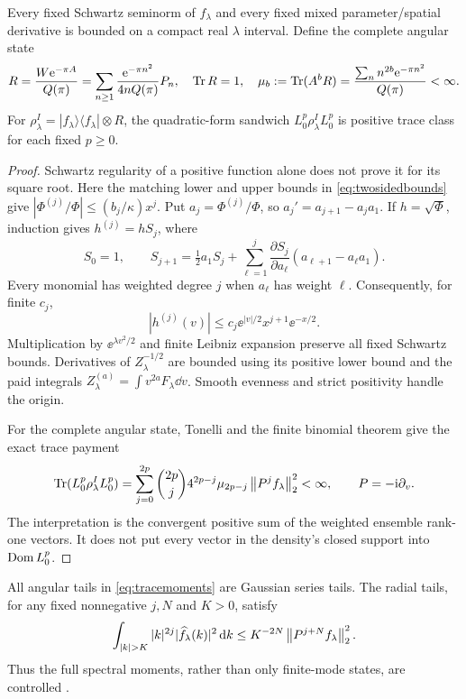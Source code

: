\begin{lemma}
\label{lem:state}
Every fixed Schwartz seminorm of $f_\lambda$ and every fixed mixed
parameter/spatial derivative is bounded on a compact real $\lambda$
interval. Define the complete angular state
\begin{equation}\label{eq:R}
 R=\frac{W\mathrm e^{-\pi A}}{Q(\pi)}
  =\sum_{n\ge1}\frac{\mathrm e^{-\pi n^2}}{4nQ(\pi)}P_n,
 \quad \operatorname{Tr} R=1,
 \quad \mu_b:=\operatorname{Tr}(A^bR)=\frac{\sum_n n^{2b}\mathrm e^{-\pi n^2}}{Q(\pi)}<\infty.
\end{equation}
For $\rho^I_\lambda=|f_\lambda\rangle\langle f_\lambda|\otimes R$,
the quadratic-form sandwich $L_0^p\rho^I_\lambda L_0^p$ is positive
trace class for each fixed $p\ge0$.
\end{lemma}
\begin{proof}
Schwartz regularity of a positive function alone does not prove it for
its square root. Here the matching lower and upper bounds in
\eqref{eq:twosidedbounds} give
$|\Phi^{(j)}/\Phi|\le(b_j/\kappa)x^j$.
Put $a_j=\Phi^{(j)}/\Phi$, so
$a_j'=a_{j+1}-a_ja_1$. If $h=\sqrt\Phi$, induction gives
$h^{(j)}=hS_j$, where
\begin{equation}\label{eq:sqrtRec}
 S_0=1,\qquad
 S_{j+1}=\tfrac12a_1S_j+
 \sum_{\ell=1}^j\frac{\partial S_j}{\partial a_\ell}
 (a_{\ell+1}-a_\ell a_1).
\end{equation}
Every monomial has weighted degree $j$ when $a_\ell$ has weight $\ell$.
Consequently, for finite $c_j$,
\[
 |h^{(j)}(v)|\le c_j\ee^{|v|/2}x^{j+1}\ee^{-x/2}.
\]
Multiplication by $\ee^{\lambda v^2/2}$ and finite Leibniz expansion
preserve all fixed Schwartz bounds. Derivatives of $Z_\lambda^{-1/2}$
are bounded using its positive lower bound and the paid integrals
$Z_\lambda^{(a)}=\int v^{2a}F_\lambda\dd v$. Smooth evenness and strict
positivity handle the origin.

For the complete angular state, Tonelli and the finite binomial theorem
give the exact trace payment
\begin{equation}\label{eq:tracemoments}
 \operatorname{Tr}(L_0^p\rho^I_\lambda L_0^p)
 =\sum_{j=0}^{2p}\binom{2p}{j}4^{2p-j}\mu_{2p-j}
 \left\lVert P^jf_\lambda\right\rVert_2^2<\infty,\qquad P=-\mathrm i\partial_v.
\end{equation}
The interpretation is the convergent positive sum of the weighted
ensemble rank-one vectors. It does not put every vector in the density's
closed support into $\operatorname{Dom} L_0^p$.
\end{proof}

All angular tails in \eqref{eq:tracemoments} are Gaussian series tails.
The radial tails, for any fixed nonnegative $j,N$ and $K>0$, satisfy
\[
 \int_{|k|>K}|k|^{2j}|\widehat f_\lambda(k)|^2\dd k
 \le K^{-2N}\norm{P^{j+N}f_\lambda}_2^2.
\]
Thus the full spectral moments, rather than only finite-mode states,
are controlled \cite[Section 3]{TNDDirect}.

